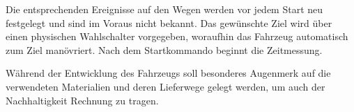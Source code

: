 \documentclass[../main.tex]{subfiles}
\begin{document}
Die entsprechenden Ereignisse auf den Wegen werden vor jedem Start neu
festgelegt und sind im Voraus nicht bekannt. Das gewünschte Ziel wird über
einen physischen Wahlschalter vorgegeben, woraufhin das Fahrzeug automatisch
zum Ziel manövriert. Nach dem Startkommando beginnt die Zeitmessung.

Während der Entwicklung des Fahrzeugs soll besonderes Augenmerk auf die
verwendeten Materialien und deren Lieferwege gelegt werden, um auch der
Nachhaltigkeit Rechnung zu tragen.
\end{document}
